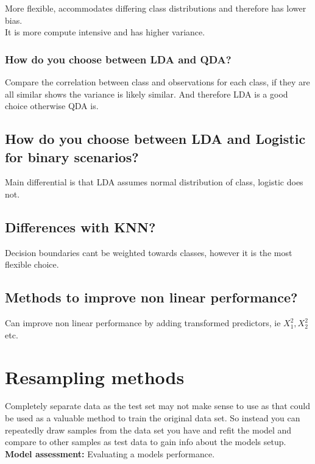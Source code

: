 \documentclass[11pt]{scrartcl} %
\begin{document}
More flexible, accommodates differing class distributions and therefore has lower bias.\\

It is more compute intensive and has higher variance.

\subsubsection{How do you choose between LDA and QDA?}

Compare the correlation between class and observations for each class, if they are all similar shows
the variance is likely similar. And therefore LDA is a good choice otherwise QDA is.

\subsection{How do you choose between LDA and Logistic for binary scenarios?}

Main differential is that LDA assumes normal distribution of class, logistic does not.

\subsection{Differences with KNN?}

Decision boundaries cant be weighted towards classes, however it is the most flexible choice.

\subsection{Methods to improve non linear performance?}

Can improve non linear performance by adding transformed predictors, ie \(X_1^2,X_2^2\) etc.

\section{Resampling methods}

Completely separate data as the test set may not make sense to use as that could be used as
a valuable method to train the original data set. So instead you can repeatedly draw samples
from the data set you have and refit the model and compare to other samples as test data to gain
info about the models setup.\\

\textbf{Model assessment:} Evaluating a models performance.
\end{document}
